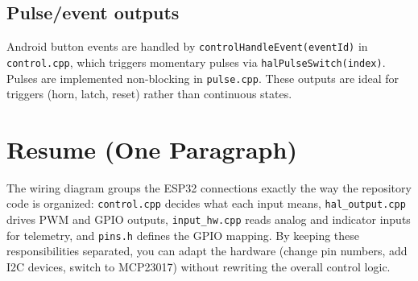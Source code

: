 \subsection{Pulse/event outputs}
Android button events are handled by \texttt{controlHandleEvent(eventId)} in \texttt{control.cpp}, which triggers
momentary pulses via \texttt{halPulseSwitch(index)}. Pulses are implemented non-blocking in \texttt{pulse.cpp}.
These outputs are ideal for triggers (horn, latch, reset) rather than continuous states.

\section{Resume (One Paragraph)}
\label{sec:wiring-resume}

The wiring diagram groups the ESP32 connections exactly the way the repository code is organized:
\texttt{control.cpp} decides what each input means, \texttt{hal\_output.cpp} drives PWM and GPIO outputs,
\texttt{input\_hw.cpp} reads analog and indicator inputs for telemetry, and \texttt{pins.h} defines the GPIO mapping.
By keeping these responsibilities separated, you can adapt the hardware (change pin numbers, add I2C devices, switch to MCP23017)
without rewriting the overall control logic.
